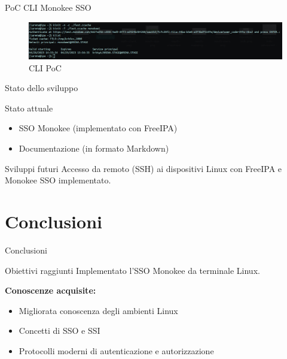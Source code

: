\documentclass{beamer}
\begin{document}
	\begin{frame}{PoC CLI Monokee SSO}
		\begin{figure}[H] 
			\centering 
			\includegraphics[width=\columnwidth]{immagini/ipa-cli.png} 
			\caption{CLI PoC}
			\label{fig:cli-sso}
		\end{figure}
		
		
	\end{frame}
	\begin{frame}{Stato dello sviluppo}
				
		\begin{exampleblock}{Stato attuale}
			\begin{itemize}
				\item SSO Monokee (implementato con FreeIPA) \vspace{.5em}
				\item Documentazione (in formato Markdown) \vspace{.5em}
			\end{itemize}
		\end{exampleblock}
		
		\begin{block}{Sviluppi futuri}
			Accesso da remoto (SSH) ai dispositivi Linux con FreeIPA e Monokee SSO implementato.
		\end{block}
	
	\end{frame}
	
	

	\section{Conclusioni}
	\begin{frame}{Conclusioni}
		
		\begin{exampleblock}{Obiettivi raggiunti}
			Implementato l'SSO Monokee da terminale Linux.
		\end{exampleblock}
				
		\vspace{.5em} \textbf{Conoscenze acquisite:} \vspace{.5em}
		\begin{itemize}
			\item Migliorata conoscenza degli ambienti Linux \vspace{.5em}
			\item Concetti di SSO e SSI \vspace{.5em}
			\item Protocolli moderni di autenticazione e autorizzazione \vspace{.5em}
		\end{itemize}
	
	\end{frame}
	
\end{document}
